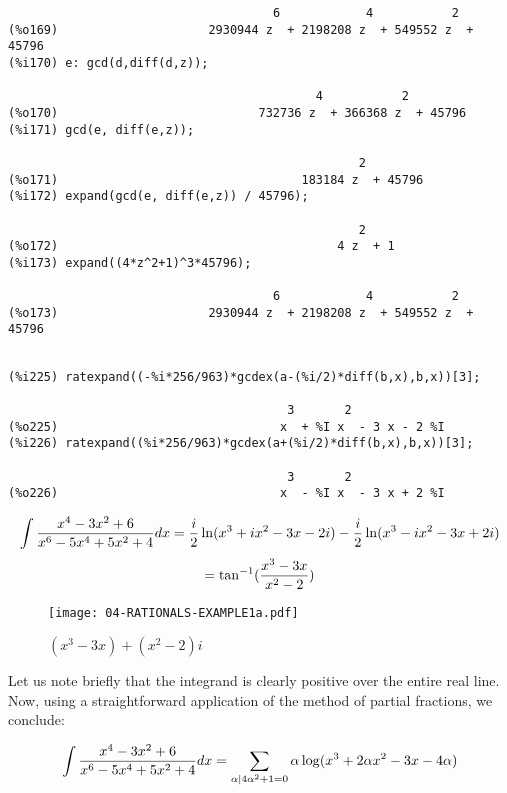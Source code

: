 {\begin{verbatim}
                                     6            4           2
(%o169)                     2930944 z  + 2198208 z  + 549552 z  + 45796
(%i170) e: gcd(d,diff(d,z));

                                           4           2
(%o170)                            732736 z  + 366368 z  + 45796
(%i171) gcd(e, diff(e,z));

                                                 2
(%o171)                                  183184 z  + 45796
(%i172) expand(gcd(e, diff(e,z)) / 45796);

                                                 2
(%o172)                                       4 z  + 1
(%i173) expand((4*z^2+1)^3*45796);

                                     6            4           2
(%o173)                     2930944 z  + 2198208 z  + 549552 z  + 45796


\end{verbatim}}

{\small\begin{verbatim}
(%i225) ratexpand((-%i*256/963)*gcdex(a-(%i/2)*diff(b,x),b,x))[3];

                                       3       2
(%o225)                               x  + %I x  - 3 x - 2 %I
(%i226) ratexpand((%i*256/963)*gcdex(a+(%i/2)*diff(b,x),b,x))[3];

                                       3       2
(%o226)                               x  - %I x  - 3 x + 2 %I
\end{verbatim}}

$$\int {{x^4-3x^2+6}\over{x^6-5x^4+5x^2+4}} dx =
   {i\over2}\ln(x^3+ix^2-3x-2i) - {i\over2}\ln(x^3-ix^2-3x+2i)$$
$$=\tan^{-1}({{x^3-3x}\over{x^2-2}})$$

\vfill

\begin{figure}[h]
\begin{center}
\texttt{[image: 04-RATIONALS-EXAMPLE1a.pdf]}
\end{center}
\caption{$(x^3-3x)+(x^2-2)i$}
\end{figure}

Let us note briefly that the integrand is clearly positive over the
entire real line.  Now, using a straightforward application of
the method of partial fractions, we conclude:

$$\int {{x^4-3x^2+6}\over{x^6-5x^4+5x^2+4}} dx =
   \sum_{\alpha\mid 4\alpha^2+1=0} \alpha \log(x^3+2\alpha x^2-3x-4\alpha)$$


